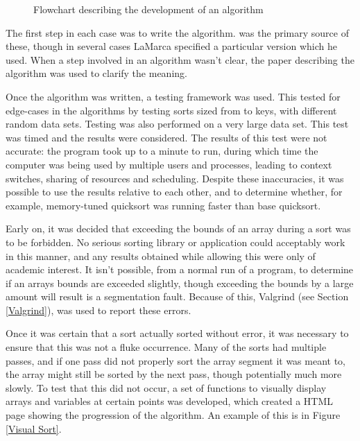 \begin{figure}
\caption{Flowchart describing the development of an algorithm}
\label{Flowchart}
\end{figure}


The first step in each case was to write the algorithm. \cite{Sedgewick02} was
the primary source of these, though in several cases LaMarca specified a
particular version which he used. When a step involved in an algorithm wasn't
clear, the paper describing the algorithm was used to clarify the meaning.

Once the algorithm was written, a testing framework was used. This tested for
edge-cases in the algorithms by testing sorts sized from  to 
keys, with different random data sets. Testing was also performed on a very
large data set.  This test was timed and the results were considered. The
results of this test were not accurate: the program took up to a minute to run,
during which time the computer was being used by multiple users and processes,
leading to context switches, sharing of resources and scheduling. Despite these
inaccuracies, it was possible to use the results relative to each other, and to
determine whether, for example, memory-tuned quicksort was running faster than
base quicksort.

Early on, it was decided that exceeding the bounds of an array
during a sort was to be forbidden. No serious sorting library or application
could acceptably work in this manner, and any results obtained while allowing
this were only of academic interest. It isn't possible, from a normal run of a
program, to determine if an arrays bounds are exceeded slightly, though exceeding
the bounds by a large amount will result is a segmentation fault. Because of
this, Valgrind (see Section \ref{Valgrind}), was used to report these errors.

Once it was certain that a sort actually sorted without error, it was necessary
to ensure that this was not a fluke occurrence. Many of the sorts had multiple
passes, and if one pass did not properly sort the array segment it was meant to,
the array might still be sorted by the next pass, though potentially much more
slowly. To test that this did not occur, a set of functions to visually display
arrays and variables at certain points was developed, which created a HTML page
showing the progression of the algorithm. An example of this is in Figure
\vref{Visual Sort}.

